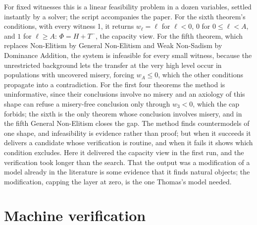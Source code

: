 \documentclass[
  11pt,
  letterpaper,
  DIV=11,
  numbers=noendperiod,
  twoside]{scrartcl}
\begin{document}
For fixed witnesses this is a linear feasibility problem in a dozen
variables, settled instantly by a solver; the script accompanies the
paper. For the sixth theorem's conditions, with every witness 1, it
returns \(w_\ell = \ell\) for \(\ell < 0\), \(0\) for
\(0 \leq \ell < A\), and \(1\) for \(\ell \geq A\): \(\Phi = H + T^-\),
the capacity view. For the fifth theorem, which replaces Non-Elitism by
General Non-Elitism and Weak Non-Sadism by Dominance Addition, the
system is infeasible for every small witness, because the unrestricted
background lets the transfer at the very high level occur in populations
with uncovered misery, forcing \(w_A \leq 0\), which the other
conditions propagate into a contradiction. For the first four theorems
the method is uninformative, since their conclusions involve no misery
and an axiology of this shape can refuse a misery-free conclusion only
through \(w_3 < 0\), which the cap forbids; the sixth is the only
theorem whose conclusion involves misery, and in the fifth General
Non-Elitism closes the gap. The method finds countermodels of one shape,
and infeasibility is evidence rather than proof; but when it succeeds it
delivers a candidate whose verification is routine, and when it fails it
shows which condition excludes. Here it delivered the capacity view in
the first run, and the verification took longer than the search. That
the output was a modification of a model already in the literature is
some evidence that it finds natural objects; the modification, capping
the layer at zero, is the one Thomas's model needed.

\section{Machine verification}\label{sec-lean}
\end{document}
